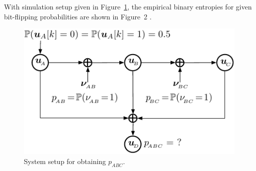 \label{AppendixA:binaryEntropies}

With simulation setup given in Figure~\ref{fig:p_abc}, the empirical binary entropies for given bit-flipping probabilities are shown in Figure~2 \citep{xiong2004_dscForSensorNetworks}.
\begin{figure}[h]
\centering \includegraphics[scale=1]{Lampiran-A/figures/binaryEntropiesSystemSetup-eps-converted-to.pdf}
  \caption{System setup for obtaining $p_{ABC}$.}
  \label{fig:p_abc}	
\end{figure}